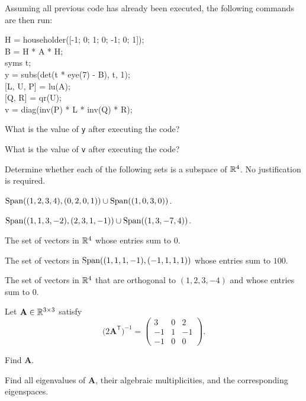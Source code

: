 \begin{problem}
Assuming all previous code has already been executed, the following commands are then run:

{\small\ttfamily
\begin{tabbing}
H = householder([-1; 0; 1; 0; -1; 0; 1]);\\
B = H * A * H;\\
syms t;\\
y = subs(det(t * eye(7) - B), t, 1);\\
{}[L, U, P] = lu(A);\\
{}[Q, R] = qr(U);\\
v = diag(inv(P) * L * inv(Q) * R);
\end{tabbing}
}

\begin{problemsubparts}[resume]
\item What is the value of \texttt{y} after executing the code?
\item What is the value of \texttt{v} after executing the code?
\end{problemsubparts}
\end{problem}


\begin{problem}
Determine whether each of the following sets is a subspace of $\mathbb{R}^4$. No justification is required.
\begin{problemchoices}
\item $\operatorname{Span}((1,2,3,4),(0,2,0,1))\cup\operatorname{Span}((1,0,3,0))$.
\item $\operatorname{Span}((1,1,3,-2),(2,3,1,-1))\cup\operatorname{Span}((1,3,-7,4))$.
\item The set of vectors in $\mathbb{R}^4$ whose entries sum to $0$.
\item The set of vectors in $\operatorname{Span}((1,1,1,-1),(-1,1,1,1))$ whose entries sum to $100$.
\item The set of vectors in $\mathbb{R}^4$ that are orthogonal to $(1,2,3,-4)$ and whose entries sum to $0$.
\end{problemchoices}
\end{problem}

\begin{problem}
Let $\mathbf A\in\mathbb{R}^{3\times3}$ satisfy
\[
\bigl(2\mathbf A^{\mathsf T}\bigr)^{-1}=
\begin{pmatrix}
3&0&2\\
-1&1&-1\\
-1&0&0
\end{pmatrix}.
\]
\begin{problemsubparts}
\item Find $\mathbf A$.
\item Find all eigenvalues of $\mathbf A$, their algebraic multiplicities, and the corresponding eigenspaces.
\end{problemsubparts}
\end{problem}


